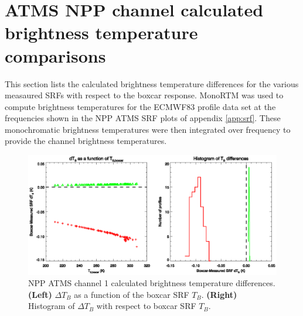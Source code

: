 \section{ATMS NPP channel calculated brightness temperature comparisons}
\label{app:dtb}
This section lists the calculated brightness temperature differences for the various measaured SRFs with respect to the boxcar response. MonoRTM \cite{Clough_2005} was used to compute brightness temperatures for the ECMWF83 profile data set \cite{ECMWF_profile_set2,Matricardi_ECMWF564} at the frequencies shown in the NPP ATMS SRF plots of appendix \ref{app:srf}. These monochromatic brightness temperatures were then integrated over frequency to provide the channel brightness temperatures.

\clearpage


\begin{figure}[H]
  \centering
  \includegraphics[scale=1]{graphics/dtb/atms_npp.ch1.TbStats.eps}
  \caption{NPP ATMS channel 1 calculated brightness temperature differences. \textbf{(Left)} $\Delta T_B$ as a function of the boxcar SRF $T_B$. \textbf{(Right)} Histogram of $\Delta T_B$ with respect to boxcar SRF $T_B$.}
  \label{fig:atms_npp.ch1.dtb}
\end{figure}

